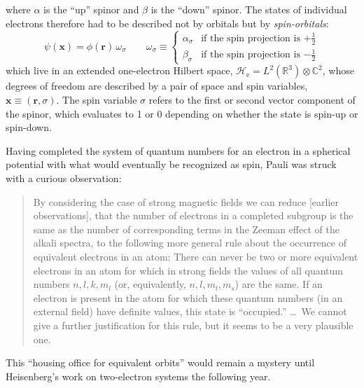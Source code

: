 where \(\alpha\) is the ``up'' spinor and \(\beta\) is the ``down'' spinor.
The states of individual electrons therefore had to be described not by orbitals
but by {\itshape spin-orbitals}:
\begin{equation}
    \psi(\mathbf{x})
    =
    \phi(\mathbf{r})\,
    \omega_\sigma
    \qquad
    \omega_\sigma
    \equiv
    \left\{
        \begin{array}{cl}
            \alpha_{\sigma}
            &
            \text{if the spin projection is \(+\tfrac{1}{2}\)}
            \\[10pt]
            \beta_{\sigma}
            &
            \text{if the spin projection is \(-\tfrac{1}{2}\)}
        \end{array}
    \right.
\end{equation}
which live in an extended one-electron Hilbert space,
\(
    \mathcal{H}_\mathrm{e}
    =
    L^2(\mathbb{R}^3)
    \otimes
    \mathbb{C}^2
\),
whose degrees of freedom are described by a pair of space and spin variables,
\(
    \mathbf{x}
    \equiv
    (\mathbf{r},\sigma)
\).
The spin variable \(\sigma\) refers to the first or second vector component of
the spinor, which evaluates to 1 or 0 depending on whether the state is spin-up
or spin-down.

Having completed the system of quantum numbers for an electron in a spherical
potential with what would eventually be recognized as spin, Pauli was struck
with a curious observation:
\begin{quote}
    By considering the case of strong magnetic fields we can reduce [earlier
    observations], that the number of electrons in a completed subgroup is the
    same as the number of corresponding terms in the Zeeman effect of the alkali
    spectra, to the following more general rule about the occurrence of
    equivalent electrons in an atom:
    There can never be two or more equivalent electrons in an atom for which
    in strong fields the values of all quantum numbers \(n, l, k, m_l\) (or,
    equivalently, \(n, l, m_l, m_s\)) are the same.
    If an electron is present in the atom for which these quantum numbers
    (in an external field) have definite values, this state is ``occupied.''
    \dots\
    We cannot give a further justification for this rule, but it seems to be a
    very plausible one.\cite{Pauli:1925p756}
\end{quote}
This ``housing office for equivalent orbits''\cite{Mehra:1982} would remain a
mystery until Heisenberg's work on two-electron systems the following year.


